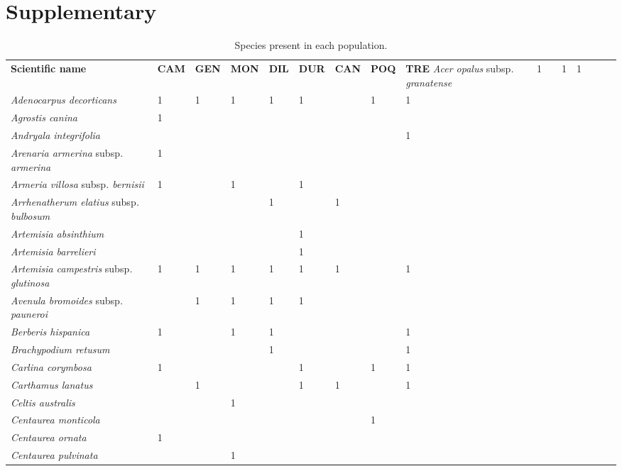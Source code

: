 \newpage
\section{Supplementary}\label{sec:multivar:Suplementary}
{%
\scriptsize
\begin{longtable}{llllllllll}
\caption{Species present in each population.}\label{tab:multivar-s1}\\ 
\toprule
 \textbf{Scientific name}  & \textbf{CAM}  & \textbf{GEN}  & \textbf{MON}  & \textbf{DIL}  & \textbf{DUR}  & \textbf{CAN}  & \textbf{POQ}  & \textbf{TRE}  \endfirsthead 
\hline
\textit{Acer opalus }subsp\textit{. granatense}  & 1 &  & 1 & 1 &  &  &  &  \\
\textit{Adenocarpus decorticans}  & 1 & 1 & 1 & 1 & 1 &  & 1 & 1 \\
\textit{Agrostis canina}  & 1 &  &  &  &  &  &  &  \\
\textit{Andryala integrifolia}  &  &  &  &  &  &  &  & 1 \\
\textit{Arenaria armerina }subsp\textit{. armerina}  & 1 &  &  &  &  &  &  &  \\
\textit{Armeria villosa }subsp\textit{. bernisii}  & 1 &  & 1 &  & 1 &  &  &  \\
\textit{Arrhenatherum elatius }subsp\textit{. bulbosum}  &  &  &  & 1 &  & 1 &  &  \\
\textit{Artemisia absinthium}  &  &  &  &  & 1 &  &  &  \\
\textit{Artemisia barrelieri}  &  &  &  &  & 1 &  &  &  \\
\textit{Artemisia campestris }subsp\textit{. glutinosa}  & 1 & 1 & 1 & 1 & 1 & 1 &  & 1 \\
\textit{Avenula bromoides }subsp\textit{. pauneroi}  &  & 1 & 1 & 1 & 1 &  &  &  \\
\textit{Berberis hispanica}  & 1 &  & 1 & 1 &  &  &  & 1 \\
\textit{Brachypodium retusum}  &  &  &  & 1 &  &  &  & 1 \\
\textit{Carlina corymbosa}  & 1 &  &  &  & 1 &  & 1 & 1 \\
\textit{Carthamus lanatus}  &  & 1 &  &  & 1 & 1 &  & 1 \\
\textit{Celtis australis}  &  &  & 1 &  &  &  &  &  \\
\textit{Centaurea monticola}  &  &  &  &  &  &  & 1 &  \\
\textit{Centaurea ornata}  & 1 &  &  &  &  &  &  &  \\
\textit{Centaurea pulvinata}  &  &  & 1 &  &  &  &  &  \\

\end{longtable}}
